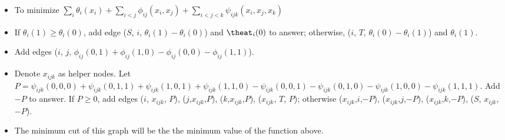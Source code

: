 \begin{itemize}
\begin{itemize}
\begin{itemize}
            \end{itemize}
        \item To minimize $\sum_i \theta_i (x_i) + \sum_{i< j} \phi_{ij} (x_i, x_j) + \sum_{i< j< k}  \psi_{ijk} (x_i, x_j, x_k)$
        \item If $\theta_i(1)\geq\theta_i(0)$, add edge ($S$, $i$, $\theta_i(1)-\theta_i(0)$) and $\theat_i(0)$ to answer; otherwise, ($i$, $T$, $\theta_i(0)-\theta_i(1)$) and $\theta_i(1)$.
        \item Add edges ($i$, $j$, $\phi_{ij}(0,1)+\phi_{ij}(1,0)-\phi_{ij}(0,0)-\phi_{ij}(1,1)$).
        \item Denote $x_{ijk}$ as helper nodes. Let $P=\psi_{ijk}(0,0,0)+\psi_{ijk}(0,1,1)+\psi_{ijk}(1,0,1)+\psi_{ijk}(1,1,0)-\psi_{ijk}(0,0,1)-\psi_{ijk}(0,1,0)-\psi_{ijk}(1,0,0)-\psi_{ijk}(1,1,1)$. Add $-P$ to answer. If $P \geq 0$, add edges ($i$, $x_{ijk}$, $P$), ($j$,$x_{ijk}$,$P$), ($k$,$x_{ijk}$,$P$), ($x_{ijk}$, $T$, $P$); otherwise ($x_{ijk}$,$i$,$-P$), ($x_{ijk}$,$j$,$-P$), ($x_{ijk}$,$k$,$-P$), ($S$, $x_{ijk}$, $-P$).
        \item The minimum cut of this graph will be the the minimum value of the function above.
    \end{itemize}
\end{itemize}
